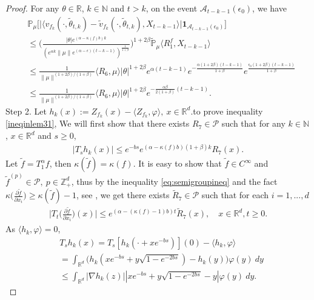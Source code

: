 \documentclass[12pt,oneside,english]{amsart}
\theoremstyle{plain}
\theoremstyle{definition}
\numberwithin{equation}{section}
\begin{document}
\begin{proof}
For any $\theta\in \mathbb{R}$, $k\in \mathbb{N}$ and $t>k$, on the event $\mathcal{A}_{t-k-1}(\epsilon_0)$, we have
    \begin{align*}
        &\mathbb{P}_{\mu}\big[\big|\langle v_{f_k}(\cdot,\tilde{\theta}_{t,k})-\tilde{v}_{f_k}(\cdot,\tilde{\theta}_{t,k}), X_{t-k-1}\rangle\big|\mathbf{1}_{\mathcal{A}_{t-k-1}(\epsilon_0)}\big]
        \\ &\leq \Big(\frac{|\theta|e^{(\alpha-\kappa(f)b)k}}{(e^{\alpha k}\|\mu\|e^{(\alpha-\epsilon)(t-k-1)})^\frac{1}{1+\beta}}\Big)^{1+2\beta}\mathbb{\tilde{P}}_{\mu}\langle R^f_1,X_{t-k-1}\rangle\\
        &\leq\frac{1}{\|\mu\|^{(1+2\beta)/(1+\beta)}}\langle R_6,\mu\rangle|\theta|^{1+2\beta}e^{\alpha(t-k-1)} e^{-\frac{\alpha(1+2\beta)(t-k-1)}{1+\beta}}e^{\frac{\epsilon_0(1+2\beta)(t-k-1)}{1+\beta}}\\
        &\leq \frac{1}{\|\mu\|^{(1+2\beta)/(1+\beta)}}\langle R_6,\mu\rangle|\theta|^{1+2\beta}e^{-\frac{\alpha\beta}{2(1+\beta)}(t-k-1)}.
    \end{align*}
 Step 2. Let $h_k(x):=Z_{f_k}(x)-\langle Z_{f_k},\varphi\rangle,~x\in\mathbb{R}^d$.to prove inequality \eqref{ineqinlem31}, We will first show that there exists $R_7\in \mathcal{P}$ such that for any $k\in\mathbb{N}$, $x\in \mathbb{R}^d$ and $s\geq 0$,
 \begin{align}
 \label{eq:31step2}
     |T_s h_k(x)|\leq e^{-bs}e^{(\alpha-\kappa(f)b)(1+\beta)k}R_7(x).
 \end{align}
 Let $\tilde{f}=T_1^{\alpha}f$, then $\kappa(\tilde{f})=\kappa(f)$. It is easy to show that $\tilde{f}\in C^{\infty}$ and $\tilde{f}^{(p)}\in\mathcal{P},~p\in\mathbb{Z}_+^d$, thus by the inequality \eqref{eq:semigroupineq} and the fact $\kappa\big(\frac{\partial \tilde{f}}{\partial x_i}\big)\geq \kappa(\tilde{f})-1$, see \cite[Lemma 2.3]{RSZ}, we get there exists $\tilde{R}_7\in \mathcal{P}$ such that for each $i=1,...,d$
 \begin{align}
 \label{ineq-temp}
     \Big|T_t\big(\frac{\partial\tilde{f}}{\partial x_i}\big)(x)\Big|\leq e^{(\alpha-(\kappa(f)-1)b)t}\tilde{R}_7(x), \quad x\in \mathbb {R}^d, t\geq 0.
 \end{align}
 As $\langle h_k,\varphi\rangle=0$,
 \begin{align}
     &T_s h_k(x)= T_s [h_k(\cdot+xe^{-bs})] (0)-\langle h_k,\varphi\rangle
     \\ &= \int_{\mathbb{R}^d}\big(h_k(xe^{-bs}+y\sqrt{1-e^{-2bs}})-h_k(y)\big)\varphi (y)~dy
     \\ &\leq \int_{\mathbb{R}^d}|\nabla h_k(z)||xe^{-bs}+y\sqrt{1-e^{-2bs}}-y|\varphi (y)~dy.

\end{align}
\end{proof}
\end{document}
